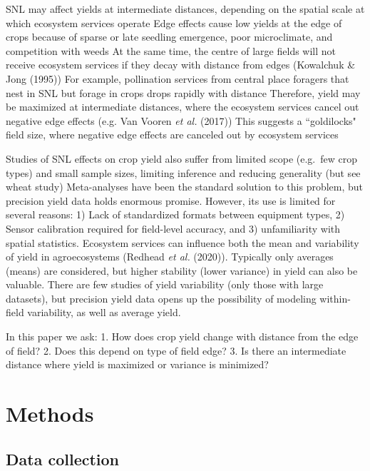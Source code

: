 \documentclass[]{elsarticle} %
\begin{document}
SNL may affect yields at intermediate distances, depending on the spatial scale at which ecosystem services operate
Edge effects cause low yields at the edge of crops because of sparse or late seedling emergence, poor microclimate, and competition with weeds
At the same time, the centre of large fields will not receive ecosystem services if they decay with distance from edges (Kowalchuk \& Jong (1995))
For example, pollination services from central place foragers that nest in SNL but forage in crops drops rapidly with distance
Therefore, yield may be maximized at intermediate distances, where the ecosystem services cancel out negative edge effects (e.g. Van Vooren \emph{et al.} (2017))
This suggests a ``goldilocks" field size, where negative edge effects are canceled out by ecosystem services

Studies of SNL effects on crop yield also suffer from limited scope (e.g.~few crop types) and small sample sizes, limiting inference and reducing generality (but see wheat study)
Meta-analyses have been the standard solution to this problem, but precision yield data holds enormous promise.
However, its use is limited for several reasons: 1) Lack of standardized formats between equipment types, 2) Sensor calibration required for field-level accuracy, and 3) unfamiliarity with spatial statistics.
Ecosystem services can influence both the mean and variability of yield in agroecosystems (Redhead \emph{et al.} (2020)).
Typically only averages (means) are considered, but higher stability (lower variance) in yield can also be valuable.
There are few studies of yield variability (only those with large datasets), but precision yield data opens up the possibility of modeling within-field variability, as well as average yield.

In this paper we ask:
1. How does crop yield change with distance from the edge of field?
2. Does this depend on type of field edge?
3. Is there an intermediate distance where yield is maximized or variance is minimized?

\hypertarget{methods}{%
\section{Methods}\label{methods}}

\hypertarget{data-collection}{%
\subsection{Data collection}\label{data-collection}}
\end{document}

